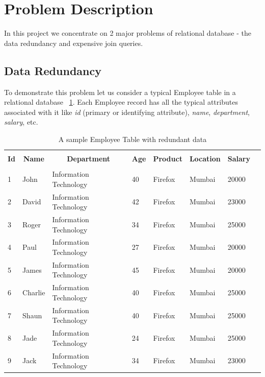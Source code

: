 \documentclass[12pt, oneside]{book}
\begin{document}
\section{Problem Description}
In this project we concentrate on 2 major problems of relational database - the data redundancy and expensive join queries.
\subsection{Data Redundancy}
To demonstrate this problem let us consider a typical Employee table in a relational database ~\ref{tab:employee_demo}. Each Employee record has all the typical attributes associated with it like \emph{id} (primary or identifying attribute), \emph{name}, \emph{department}, \emph{salary}, etc. 
\begin{table}[h]
\begin{center}
    \begin{tabular}{| m{} | m{} | m{} | m{} | m{} | m{} | m{} | @{}m{0pt}@{}}
    \hline
    \multicolumn{1}{|c|}{} & \multicolumn{1}{c|}{} & \multicolumn{1}{c|}{} & \multicolumn{1}{c|}{} & \multicolumn{1}{c|}{} & \multicolumn{1}{c|}{} & \multicolumn{1}{c|}{} &  \\
    \multicolumn{1}{|c|}{\textbf{Id}} & \multicolumn{1}{c|}{\textbf{Name}} & \multicolumn{1}{c|}{\textbf{Department}} & \multicolumn{1}{c|}{\textbf{Age}} & \multicolumn{1}{c|}{\textbf{Product}} & \multicolumn{1}{c|}{\textbf{Location}} & \multicolumn{1}{c|}{\textbf{Salary}} & \\
    \multicolumn{1}{|c|}{} & \multicolumn{1}{c|}{} & \multicolumn{1}{c|}{} & \multicolumn{1}{c|}{} & \multicolumn{1}{c|}{} & \multicolumn{1}{c|}{} & \multicolumn{1}{c|}{} &  \\
    \hline
    1 & John & Information Technology & 40 & Firefox & Mumbai & 20000 & \\ [1ex] \hline
    2 & David & Information Technology & 42 & Firefox & Mumbai & 23000 & \\ [1ex] \hline
    3 & Roger & Information Technology & 34 & Firefox & Mumbai & 25000 & \\ [1ex] \hline
    4 & Paul & Information Technology & 27 & Firefox & Mumbai & 20000 & \\ [1ex] \hline
    5 & James & Information Technology & 45 & Firefox & Mumbai & 20000 & \\ [1ex] \hline
    6 & Charlie & Information Technology & 40 & Firefox & Mumbai & 25000 & \\ [1ex] \hline
    7 & Shaun & Information Technology & 40 & Firefox & Mumbai & 25000 & \\ [1ex] \hline
    8 & Jade & Information Technology & 24 & Firefox & Mumbai & 25000 & \\ [1ex] \hline
    9 & Jack & Information Technology & 34 & Firefox & Mumbai & 23000 & \\ [1ex] \hline
    \end{tabular}
\end{center}
    \caption{A sample Employee Table with redundant data}
    \label{tab:employee_demo}
\end{table}
\end{document}

